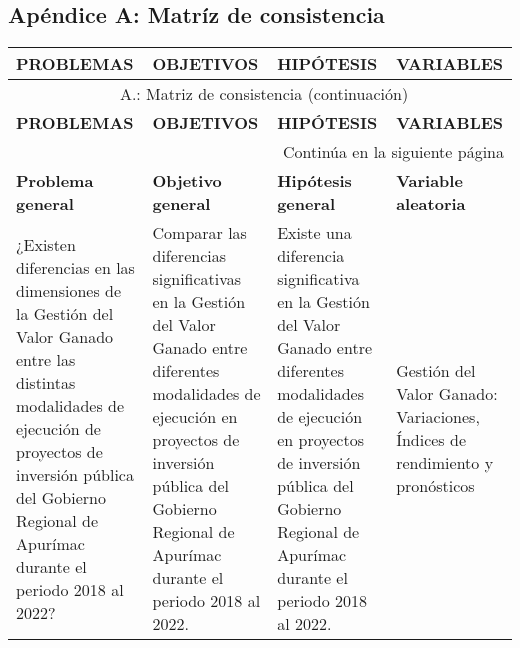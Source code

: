 \pagestyle{plain}
\renewcommand{\thetable}{A\Alph{chapter}.\arabic{table}}
\setcounter{table}{0}

\appendix %
\renewcommand{\thefigure}{A.\arabic{figure}} %

\begin{landscape}
    \chapter{Apéndice A: Matríz de consistencia}
    \begin{longtable}{p{6cm}p{5.5cm}p{5.5cm}p{5.5cm}}
        \toprule
        \textbf{PROBLEMAS} & \textbf{OBJETIVOS} & \textbf{HIPÓTESIS} & \textbf{VARIABLES} \\
        \midrule
        \endfirsthead
        
        \multicolumn{4}{c}{{\tablename\ \thetable{}: Matriz de consistencia (continuación)}} \\
        \toprule
        \textbf{PROBLEMAS} & \textbf{OBJETIVOS} & \textbf{HIPÓTESIS} & \textbf{VARIABLES} \\
        \midrule
        \endhead
        
        \midrule
        \multicolumn{4}{r}{{Continúa en la siguiente página}} \\
        \endfoot
        
        \bottomrule
        \endlastfoot
        
        \textbf{Problema general} & \textbf{Objetivo general} & \textbf{Hipótesis general} & \textbf{Variable aleatoria} \\
        \midrule
                    
        ¿Existen diferencias en las dimensiones de la Gestión del Valor Ganado entre las distintas modalidades de ejecución de proyectos de inversión pública del Gobierno Regional de Apurímac durante el periodo 2018 al 2022? & Comparar las diferencias significativas en la Gestión del Valor Ganado entre diferentes modalidades de ejecución en proyectos de inversión pública del Gobierno Regional de Apurímac durante el periodo 2018 al 2022. & Existe una diferencia significativa en la Gestión del Valor Ganado entre diferentes modalidades de ejecución en proyectos de inversión pública del Gobierno Regional de Apurímac durante el periodo 2018 al 2022. & Gestión del Valor Ganado:  Variaciones, Índices de rendimiento y pronósticos \\
        

\end{longtable}
\end{landscape}

